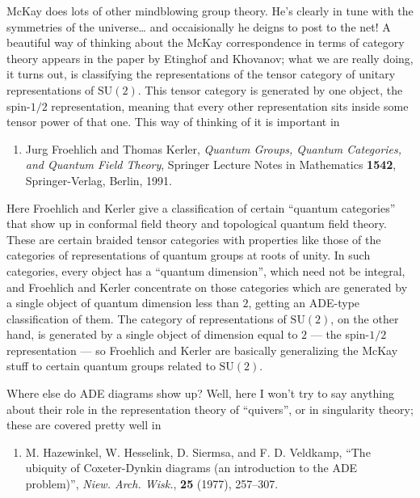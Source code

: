 \documentclass{article}
\def\tightlist{}
\begin{document}
McKay does lots of other mindblowing group theory. He's clearly in tune
with the symmetries of the universe\ldots{} and occaisionally he deigns
to post to the net! A beautiful way of thinking about the McKay
correspondence in terms of category theory appears in the paper by
Etinghof and Khovanov; what we are really doing, it turns out, is
classifying the representations of the tensor category of unitary
representations of \(\mathrm{SU}(2)\). This tensor category is generated
by one object, the spin-\(1/2\) representation, meaning that every other
representation sits inside some tensor power of that one. This way of
thinking of it is important in

\begin{enumerate}
\def\labelenumi{\arabic{enumi})}
\setcounter{enumi}{4}
\tightlist
\item
  Jurg Froehlich and Thomas Kerler, \emph{Quantum Groups, Quantum
  Categories, and Quantum Field Theory}, Springer Lecture Notes in
  Mathematics \textbf{1542}, Springer-Verlag, Berlin, 1991.
\end{enumerate}

Here Froehlich and Kerler give a classification of certain ``quantum
categories'' that show up in conformal field theory and topological
quantum field theory. These are certain braided tensor categories with
properties like those of the categories of representations of quantum
groups at roots of unity. In such categories, every object has a
``quantum dimension'', which need not be integral, and Froehlich and
Kerler concentrate on those categories which are generated by a single
object of quantum dimension less than \(2\), getting an ADE-type
classification of them. The category of representations of
\(\mathrm{SU}(2)\), on the other hand, is generated by a single object
of dimension equal to \(2\) --- the spin-\(1/2\) representation --- so
Froehlich and Kerler are basically generalizing the McKay stuff to
certain quantum groups related to \(\mathrm{SU}(2)\).

Where else do ADE diagrams show up? Well, here I won't try to say
anything about their role in the representation theory of ``quivers'',
or in singularity theory; these are covered pretty well in

\begin{enumerate}
\def\labelenumi{\arabic{enumi})}
\setcounter{enumi}{5}
\tightlist
\item
  M. Hazewinkel, W. Hesselink, D. Siermsa, and F. D. Veldkamp, ``The
  ubiquity of Coxeter-Dynkin diagrams (an introduction to the ADE
  problem)'', \emph{Niew. Arch. Wisk.}, \textbf{25} (1977), 257--307.
\end{enumerate}
\end{document}
